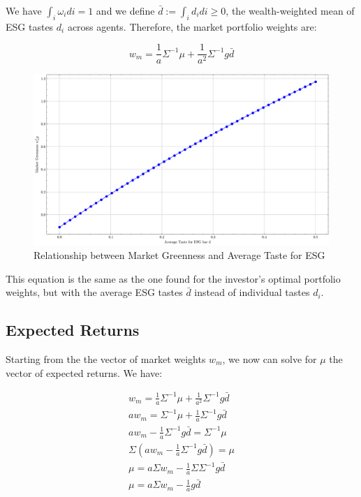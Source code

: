 We have $\int_i \omega_i di = 1$ and we define $\bar{d} := \int_i d_i di \geq 0$,
the wealth-weighted mean of ESG tastes $d_i$ across agents. Therefore,
the market portfolio weights are:

\begin{equation}
    w_m = \frac{1}{a} \Sigma^{-1} \mu + \frac{1}{a^2} \Sigma^{-1} g \bar{d}
\end{equation}


\begin{figure}
    \centering
    \includegraphics[width=1\textwidth]{../images/chapter01/market_greenness_vs_average_esg_taste.png}
    \caption{Relationship between Market Greenness and Average Taste for ESG}
    \label{fig:esg_taste_market}
\end{figure}

This equation is the same as the one found 
for the investor's optimal portfolio weights, but with the
average ESG tastes $\bar{d}$ instead of individual tastes $d_i$.

\subsection{Expected Returns}

Starting from the the vector of market weights $w_m$, we now can 
solve for $\mu$ the vector of expected returns. We have:

\begin{equation}
    \begin{aligned}
    w_m = \frac{1}{a} \Sigma^{-1} \mu + \frac{1}{a^2} \Sigma^{-1} g \bar{d} \\
    a w_m = \Sigma^{-1} \mu + \frac{1}{a} \Sigma^{-1} g \bar{d} \\
    a w_m - \frac{1}{a} \Sigma^{-1} g \bar{d} = \Sigma^{-1} \mu \\
    \Sigma (a w_m - \frac{1}{a} \Sigma^{-1} g \bar{d}) = \mu \\ 
    \mu = a \Sigma w_m - \frac{1}{a} \Sigma \Sigma^{-1} g \bar{d} \\
    \mu = a \Sigma w_m - \frac{1}{a} g \bar{d}
    \end{aligned}
\end{equation}

